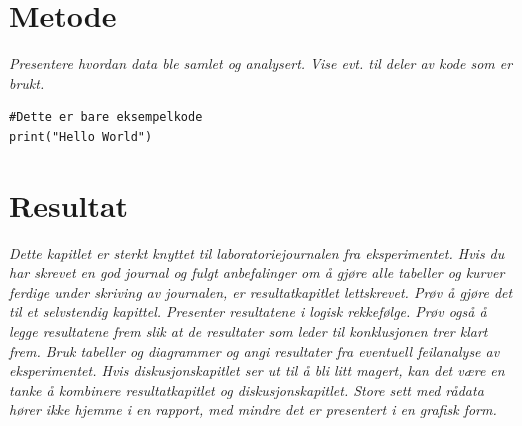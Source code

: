\documentclass[5p]{elsarticle}
\begin{document}

\section{Metode}
\textit{Presentere hvordan data ble samlet og analysert. Vise evt. til deler av kode som er brukt. }

\begin{verbatim}
#Dette er bare eksempelkode
print("Hello World")
\end{verbatim}

\section{Resultat}

\textit{
Dette kapitlet er sterkt knyttet til laboratoriejournalen fra eksperimentet. Hvis du har skrevet en god journal og
fulgt anbefalinger om å gjøre alle tabeller og kurver ferdige under skriving av journalen, er resultatkapitlet lettskrevet. 
Prøv å gjøre det til et selvstendig kapittel. Presenter resultatene i logisk rekkefølge. Prøv også å legge resultatene frem
slik at de resultater som leder til konklusjonen trer klart frem. Bruk tabeller og diagrammer og angi resultater fra
eventuell feilanalyse av eksperimentet.  Hvis diskusjonskapitlet ser ut til å bli litt magert, kan det være en tanke å
kombinere resultatkapitlet og diskusjonskapitlet. Store sett med rådata hører ikke hjemme i en rapport, med mindre det er
presentert i en grafisk form.
}
\end{document}
